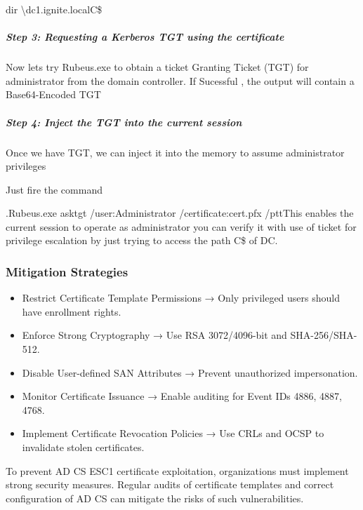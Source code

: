 dir \textbackslash{}dc1.ignite.localC\$

\subparagraph{\textbf{Step 3: Requesting a Kerberos TGT using the certificate}}

Now lets try Rubeus.exe to obtain a ticket Granting Ticket (TGT) for administrator from the domain controller. If Sucessful , the output will contain a Base64-Encoded TGT

\subparagraph{\textbf{Step 4: Inject the TGT into the current session}}

Once we have TGT, we can inject it into the memory to assume administrator privileges

Just fire the command

.Rubeus.exe asktgt /user:Administrator /certificate:cert.pfx /pttThis enables the current session to operate as administrator you can verify it with use of ticket for privilege escalation by just trying to access the path C\$ of DC.

\subsubsection{Mitigation Strategies}

\begin{itemize}
    \item Restrict Certificate Template Permissions → Only privileged users should have enrollment rights.
    \item Enforce Strong Cryptography → Use RSA 3072/4096-bit and SHA-256/SHA-512.
    \item Disable User-defined SAN Attributes → Prevent unauthorized impersonation.
    \item Monitor Certificate Issuance → Enable auditing for Event IDs 4886, 4887, 4768.
    \item Implement Certificate Revocation Policies → Use CRLs and OCSP to invalidate stolen certificates.
\end{itemize}
To prevent AD CS ESC1 certificate exploitation, organizations must implement strong security measures. Regular audits of certificate templates and correct configuration of AD CS can mitigate the risks of such vulnerabilities.

 